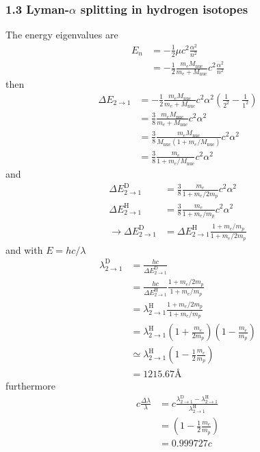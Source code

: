 \documentclass[10pt,a4paper]{book}
\theoremstyle{definition}
\begin{document}
\subsubsection{1.3 Lyman-$\alpha$ splitting in hydrogen isotopes}
The energy eigenvalues are
\begin{align}
E_n
&=-\frac{1}{2}\mu c^2\frac{\alpha^2}{n^2}\\
&=-\frac{1}{2}\frac{m_eM_\text{nuc}}{m_e+M_\text{nuc}} c^2\frac{\alpha^2}{n^2}
\end{align}
then
\begin{align}
\Delta E_{2\rightarrow1}
&=-\frac{1}{2}\frac{m_eM_\text{nuc}}{m_e+M_\text{nuc}} c^2\alpha^2\left(\frac{1}{2^2}-\frac{1}{1^2}\right)\\
&=\frac{3}{8}\frac{m_eM_\text{nuc}}{m_e+M_\text{nuc}} c^2\alpha^2\\
&=\frac{3}{8}\frac{m_eM_\text{nuc}}{M_\text{nuc}(1+m_e/M_\text{nuc})} c^2\alpha^2\\
&=\frac{3}{8}\frac{m_e}{1+m_e/M_\text{nuc}} c^2\alpha^2
\end{align}
and
\begin{align}
\Delta E^\text{D}_{2\rightarrow1}
&=\frac{3}{8}\frac{m_e}{1+m_e/2m_p} c^2\alpha^2\\
\Delta E^\text{H}_{2\rightarrow1}
&=\frac{3}{8}\frac{m_e}{1+m_e/m_p} c^2\alpha^2\\
\rightarrow \Delta E^\text{D}_{2\rightarrow1}&= \Delta E^\text{H}_{2\rightarrow1}\frac{1+m_e/m_p}{1+m_e/2m_p}
\end{align}
and with $E=hc/\lambda$
\begin{align}
\lambda^\text{D}_{2\rightarrow1}&=\frac{hc}{\Delta E^\text{D}_{2\rightarrow1}}\\
&=\frac{hc}{\Delta E^\text{H}_{2\rightarrow1}}\frac{1+m_e/2m_p}{1+m_e/m_p}\\
&=\lambda^\text{H}_{2\rightarrow1}\frac{1+m_e/2m_p}{1+m_e/m_p}\\
&=\lambda^\text{H}_{2\rightarrow1}\left(1+\frac{m_e}{2m_p}\right)\left(1-\frac{m_e}{m_p}\right)\\
&\simeq\lambda^\text{H}_{2\rightarrow1}\left(1-\frac{1}{2}\frac{m_e}{m_p}\right)\\
&=1215.67\text{\AA}
\end{align}
furthermore
\begin{align}
c\frac{\Delta\lambda}{\lambda}&=
c\frac{\lambda^\text{D}_{2\rightarrow1}-\lambda^\text{H}_{2\rightarrow1}}{\lambda^\text{H}_{2\rightarrow1}}\\
&=\left(1-\frac{1}{2}\frac{m_e}{m_p}\right)\\
&=0.999727c
\end{align}
\end{document}
